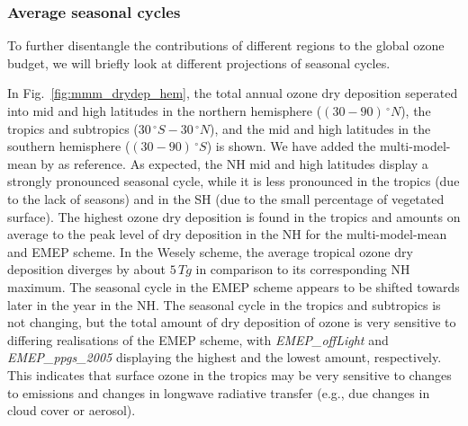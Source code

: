 \documentclass[gmd, manuscript]{copernicus}
\begin{document}
\subsubsection{Average seasonal cycles}
\label{subsubsec:seasons}
%
To further disentangle the contributions of different regions to the global ozone budget, we will briefly look at different projections of seasonal cycles.

In Fig.~\ref{fig:mmm_drydep_hem}, the total annual ozone dry deposition seperated into mid and high latitudes in the northern hemisphere ($(30-90)\,\unit{^\circ N}$), the tropics and subtropics ($30\,\unit{^\circ S}-30\,\unit{^\circ N}$), and the mid and high latitudes in the southern hemisphere ($(30-90)\,\unit{^\circ S}$) is shown. We have added the multi-model-mean by \citet{ACP:Hardacre2015} as reference. As expected, the NH mid and high latitudes display a strongly pronounced seasonal cycle, while it is less pronounced in the tropics (due to the lack of seasons) and in the SH (due to the small percentage of vegetated surface). The highest ozone dry deposition is found in the tropics and amounts on average to the  peak level of dry deposition in the NH for the multi-model-mean \citep{ACP:Hardacre2015} and EMEP scheme. In the Wesely scheme, the average tropical ozone dry deposition diverges by about $5\,\unit{Tg}$ in comparison to its corresponding NH maximum. The seasonal cycle in the EMEP scheme appears to be shifted towards later in the year in the NH. The seasonal cycle in the tropics and subtropics is not changing, but the total amount of dry deposition of ozone is very sensitive to differing realisations of the EMEP scheme, with \emph{EMEP\_offLight} and \emph{EMEP\_ppgs\_2005} displaying the highest and the lowest amount, respectively. This indicates that surface ozone in the tropics may be very sensitive to changes to emissions and changes in longwave radiative transfer (e.g., due changes in cloud cover or aerosol).
\end{document}
